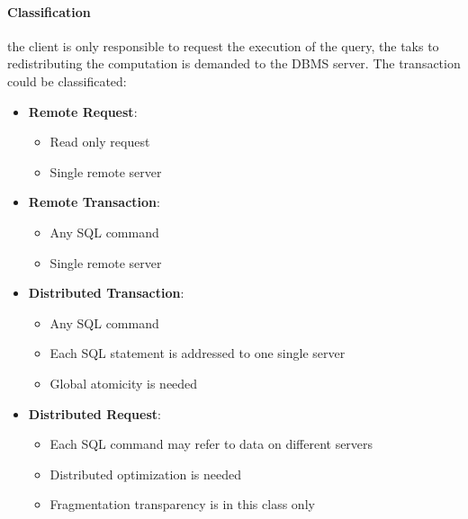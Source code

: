 \documentclass[12pt]{article}
\begin{document}
\paragraph{Classification} the client is only responsible to request the execution of the query, the taks to redistributing the computation is demanded to the DBMS server. The transaction could be classificated:
\begin{itemize}
  \item \textbf{Remote Request}:
  \begin{itemize}
    \item Read only request
    \item Single remote server
  \end{itemize}
  \item \textbf{Remote Transaction}:
  \begin{itemize}
    \item Any SQL command
    \item Single remote server
  \end{itemize}
  \item \textbf{Distributed Transaction}:
  \begin{itemize}
    \item Any SQL command
    \item Each SQL statement is addressed to one single server
    \item Global atomicity is needed
  \end{itemize}
  \item \textbf{Distributed Request}:
  \begin{itemize}
    \item Each SQL command may refer to data on different servers
    \item Distributed optimization is needed
    \item Fragmentation transparency is in this class only
  \end{itemize}
\end{itemize}
\end{document}
